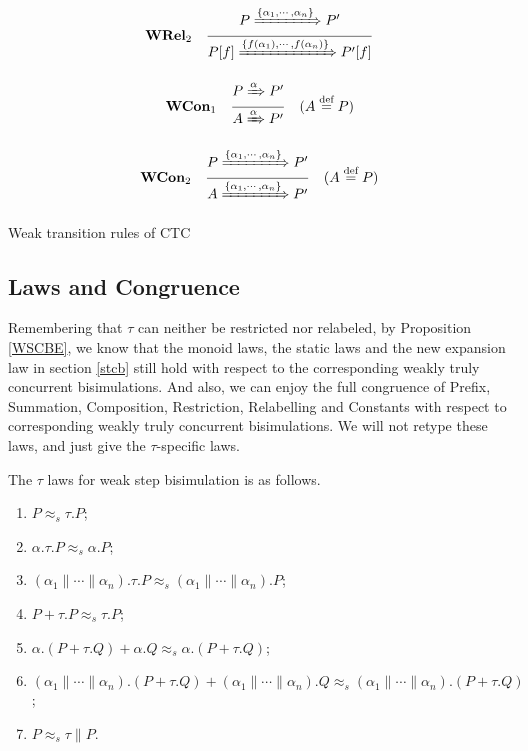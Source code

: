 \begin{center}
\begin{table}
        \[\textbf{WRel}_2\quad \frac{P\xRightarrow{\{\alpha_1,\cdots,\alpha_n\}}P'}{P[f]\xRightarrow{\{f(\alpha_1),\cdots,f(\alpha_n)\}}P'[f]}\]

        \[\textbf{WCon}_1\quad\frac{P\xRightarrow{\alpha}P'}{A\xRightarrow{\alpha}P'}\quad (A\overset{\text{def}}{=}P)\]

        \[\textbf{WCon}_2\quad\frac{P\xRightarrow{\{\alpha_1,\cdots,\alpha_n\}}P'}{A\xRightarrow{\{\alpha_1,\cdots,\alpha_n\}}P'}\quad (A\overset{\text{def}}{=}P)\]
        \caption{Weak transition rules of CTC}
        \label{WTRForCTC}
    \end{table}
\end{center}

\subsection{Laws and Congruence}

Remembering that $\tau$ can neither be restricted nor relabeled, by Proposition \ref{WSCBE}, we know that the monoid laws, the static laws and the new expansion law in section \ref{stcb} still hold with respect to the corresponding weakly truly concurrent bisimulations. And also, we can enjoy the full congruence of Prefix, Summation, Composition, Restriction, Relabelling and Constants with respect to corresponding weakly truly concurrent bisimulations. We will not retype these laws, and just give the $\tau$-specific laws.

\begin{proposition}\label{TAUWSB}
The $\tau$ laws for weak step bisimulation is as follows.
\begin{enumerate}
  \item $P\approx_s \tau.P$;
  \item $\alpha.\tau.P\approx_s \alpha.P$;
  \item $(\alpha_1\parallel\cdots\parallel\alpha_n).\tau.P\approx_s (\alpha_1\parallel\cdots\parallel\alpha_n).P$;
  \item $P+\tau.P\approx_s \tau.P$;
  \item $\alpha.(P+\tau.Q)+\alpha.Q\approx_s\alpha.(P+\tau.Q)$;
  \item $(\alpha_1\parallel\cdots\parallel\alpha_n).(P+\tau.Q)+ (\alpha_1\parallel\cdots\parallel\alpha_n).Q\approx_s (\alpha_1\parallel\cdots\parallel\alpha_n).(P+\tau.Q)$;
  \item $P\approx_s \tau\parallel P$.
\end{enumerate}
\end{proposition}

